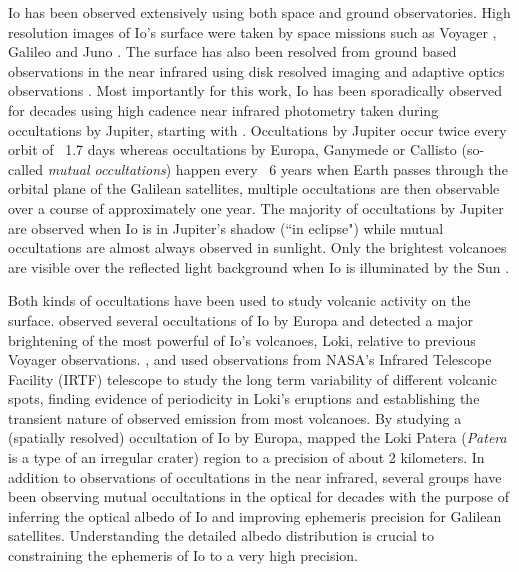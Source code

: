 \documentclass[modern]{aastex62}
\begin{document}
Io has been observed extensively using both space and ground observatories.
High resolution images of Io's surface were taken by space missions such as Voyager \citep{smith1979}, Galileo \citep{belton1996} and Juno \citep{mura2020}.
The surface has also been resolved from ground based observations in the near infrared using disk resolved imaging \citep{howell1985,simonelli1986,spencer1990} and adaptive optics observations \citep{marchis2000,marchis2005,dekleer2016}.
Most importantly for this work, Io has been sporadically observed for decades using high cadence near infrared photometry taken during occultations by Jupiter, starting with \cite{spencer1990}.
Occultations by Jupiter occur twice every orbit of ~1.7 days whereas occultations by Europa, Ganymede or Callisto (so-called \emph{mutual occultations}) happen every ~6 years when Earth passes through the orbital plane of the Galilean satellites, multiple occultations are then observable over a course of approximately one year.
The majority of occultations by Jupiter are observed when Io is in Jupiter's shadow (``in eclipse") while mutual occultations are almost always observed in sunlight.
Only the brightest volcanoes are visible over the reflected light background when Io is illuminated by the Sun \citep{veeder1994,dekleer2016a}.

Both kinds of occultations have been used to study volcanic activity on the surface.
\cite{spencer1994} observed several occultations of Io by Europa and detected a major brightening of the most powerful of Io's volcanoes, Loki, relative to previous Voyager observations.
\cite{rathbun2002},\citet{rathbun2006} and \citet{rathbun2010} used observations from NASA's 
Infrared Telescope Facility (IRTF) telescope to study the long term variability of different volcanic spots, finding evidence of periodicity in Loki's eruptions and establishing the transient nature of observed emission from most volcanoes. 
By studying a (spatially resolved) occultation of Io by Europa, \cite{dekleer2017} mapped the Loki Patera (\emph{Patera} is a type of an irregular crater) region to a precision of about 2 kilometers.
In addition to observations of occultations in the near infrared, several groups have been observing mutual occultations in the optical \citep[][and references therein]{arlot1974,saquet2018,morgado2016a} for decades with the purpose of inferring the optical albedo of Io and improving ephemeris precision for Galilean satellites.
Understanding the detailed albedo distribution is crucial to constraining the ephemeris of Io to a very high precision.
\end{document}
